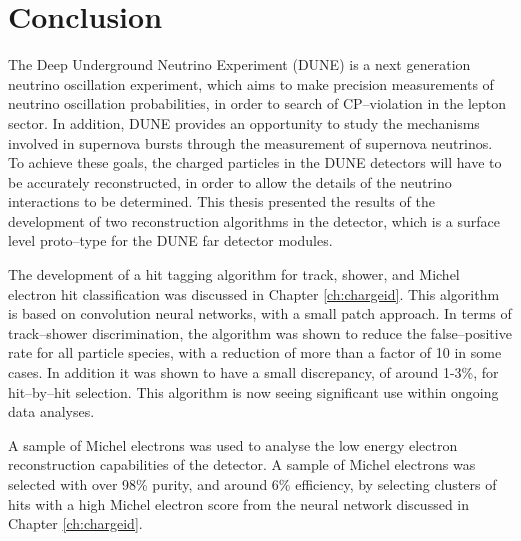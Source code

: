 \chapter{\label{ch:conclusion}Conclusion} 


\minitoc

The Deep Underground Neutrino Experiment (DUNE) is a next generation neutrino
oscillation experiment, which aims to make precision measurements of neutrino
oscillation probabilities, in order to search of CP--violation in the lepton
sector. In addition, DUNE provides an opportunity to study the mechanisms
involved in supernova bursts through the measurement of supernova neutrinos. 
To achieve these goals, the charged particles in the DUNE detectors will have to
be accurately reconstructed, in order to allow the details of the neutrino
interactions to be determined. This thesis presented the results of the
development of two reconstruction algorithms in the \protodune{} detector, which
is a surface level proto--type for the DUNE far detector modules. 

The development of a hit tagging algorithm for track, shower, and Michel
electron hit classification was discussed in Chapter \ref{ch:chargeid}. This 
algorithm is based on convolution neural networks, with a small patch 
approach. In terms of track--shower discrimination, the algorithm was shown 
to reduce the false--positive rate for all particle species, with a reduction 
of more than a factor of 10 in some cases. In addition it was shown to have a 
small discrepancy, of around 1-3\%, for hit--by--hit selection. This algorithm 
is now seeing significant use within ongoing \protodune{} data analyses. 


A sample of Michel electrons was used to analyse the low energy electron 
reconstruction capabilities of the \protodune{} detector. A sample of Michel
electrons was selected with over 98\% purity, and around 6\% efficiency, by
selecting clusters of hits with a high Michel electron score from the neural
network discussed in Chapter \ref{ch:chargeid}.  

